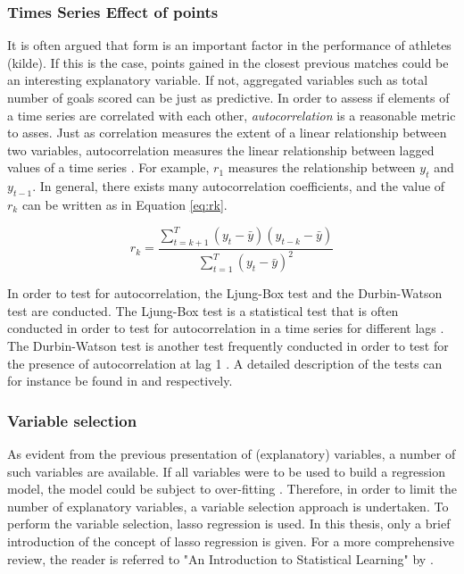 \subsubsection{Times Series Effect of points}

It is often argued that form is an important factor in the performance of athletes (kilde). If this is the case, points gained in the closest previous matches could be an interesting explanatory variable. If not, aggregated variables such as total number of goals scored can be just as predictive. In order to assess if elements of a time series are correlated with each other, \textit{autocorrelation} is a reasonable metric to asses. Just as correlation measures the extent of a linear relationship between two variables, autocorrelation measures the linear relationship between lagged values of a time series \citep{Hyndman}. For example, $r_1$ measures the relationship between $y_t$ and $y_{t-1}$. In general, there exists many autocorrelation coefficients, and the value of $r_k$ can be written as in Equation \ref{eq:rk}. 


\begin{equation}\label{eq:rk}
    r_k = \frac{\sum_{t=k+1}^T(y_t-\bar{y})(y_{t-k}-\bar{y})}{\sum_{t=1}^T(y_t-\bar{y})^2}
\end{equation}

In order to test for autocorrelation, the Ljung-Box test and the Durbin-Watson test are conducted. The Ljung-Box test is a statistical test that is often conducted in order to test for autocorrelation in a time series for different lags \citep{Hyndman}. The Durbin-Watson test is another test frequently conducted in order to test for the presence of autocorrelation at lag 1 \citep{Carol_1}. A detailed description of the tests can for instance be found in \cite{Hyndman} and \cite{Carol_1} respectively.

\subsubsection{Variable selection}

As evident from the previous presentation of (explanatory) variables, a number of such variables are available. If all variables were to be used to build a regression model, the model could be subject to over-fitting \citep{ISLR}. Therefore, in order to limit the number of explanatory variables, a variable selection approach is undertaken. To perform the variable selection, lasso regression is used. In this thesis, only a brief introduction of the concept of lasso regression is given. For a more comprehensive review, the reader is referred to "An Introduction to Statistical Learning" by \cite{ISLR}.\newpar

